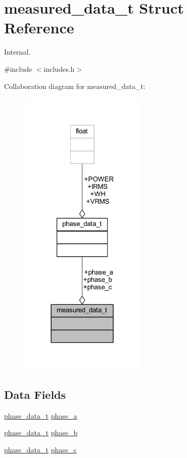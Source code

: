\hypertarget{a00029}{\section{measured\-\_\-data\-\_\-t Struct Reference}
\label{d5/d16/a00029}
}


Internal.  




{\ttfamily \#include $<$includes.\-h$>$}



Collaboration diagram for measured\-\_\-data\-\_\-t\-:\nopagebreak
\begin{figure}[H]
\begin{center}
\leavevmode
\includegraphics[width=173pt]{dc/d54/a00094}
\end{center}
\end{figure}
\subsection*{Data Fields}
\begin{DoxyCompactItemize}
\item 
\hyperlink{a00030}{phase\-\_\-data\-\_\-t} \hyperlink{a00029_ad7205e9853a503d2fab0697f5a301f6c}{phase\-\_\-a}
\item 
\hyperlink{a00030}{phase\-\_\-data\-\_\-t} \hyperlink{a00029_a48734adeb4d59d056b6e39c6e08fe21e}{phase\-\_\-b}
\item 
\hyperlink{a00030}{phase\-\_\-data\-\_\-t} \hyperlink{a00029_ad8892f27909cf51f7603adfc00d224df}{phase\-\_\-c}
\end{DoxyCompactItemize}


